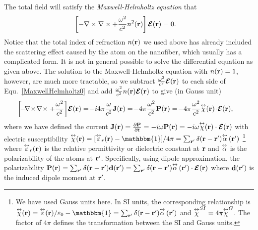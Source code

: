 The total field will satisfy the \textit{Maxwell-Helmholtz equation} that
\begin{align}
\left[ -\nabla\times\nabla\times+\frac{\omega^2}{c^2}n^2(\br) \right] \boldsymbol{\mathcal{E}}(\br) &=0. \label{MaxwellHelmholtz0}
\end{align}
Notice that the total index of refraction $ n(\mathbf{r}) $ we used above has already included the scattering effect caused by the atom on the nanofiber, which usually has a complicated form. It is not in general possible to solve the differential equation as given above. The solution to the Maxwell-Helmholtz equation with $ n(\mathbf{r})=1 $, however, are much more tractable, so we subtract $ \frac{\omega^2}{c^2} \boldsymbol{\mathcal{E}}(\mathbf{r})$ to each side of Equ.~\ref{MaxwellHelmholtz0} and add $ \frac{\omega^2}{c^2}n(\mathbf{r}) \boldsymbol{\mathcal{E}}(\mathbf{r}) $ to give (in Gauss unit)
\begin{align}\label{eq:Maxwellwithsource}
\left[\! -\! \nabla\!\times\!\nabla\!\times + \frac{\omega^2}{c^2} \right]\! \boldsymbol{\mathcal{E}}(\br) &=\! -i4\pi\frac{\omega}{c^2} \mathbf{J}(\br) =\! -4\pi\frac{\omega^2}{c^2} \mathbf{P}(\br)=\! -4\pi \frac{\omega^2}{c^2} \tensor{\chi}(\br)\! \cdot\! \boldsymbol{\mathcal{E}}(\br),
\end{align}
where we have defined the current $ \mathbf{J}(\mathbf{r})=\frac{\partial {\mathbf{P}}}{\partial {t}}=-i\omega\mathbf{P}(\mathbf{r})=-i\omega \overset{\leftrightarrow}{\chi}(\mathbf{r})\cdot \boldsymbol{\mathcal{E}}(\mathbf{r}) $ with electric susceptibility $ \tensor{\chi}(\br)=[\tensor{\varepsilon}_r(\br)-\mathbbm{1}]/4\pi = \sum_{\br'}\delta(\br-\mathbf{r}')\tensor{\alpha} \, (\br')$ \footnote{We have used Gauss units here. In SI units, the corresponding relationship is $ \tensor{\chi}(\br)=\tensor{\varepsilon}(\br)/\varepsilon_0-\mathbbm{1} = \sum_{\br'}\delta(\br-\mathbf{r}')\tensor{\alpha} \, (\br')$ and $\overset{\leftrightarrow}{\chi}^{SI}=4\pi\overset{\leftrightarrow}{\chi}^{G}  $. The factor of $ 4\pi $ defines the transformation between the SI and Gauss units. } where $\overset{\leftrightarrow}{ \varepsilon}_r(\mathbf{r}) $ is the relative permittivity or dielectric constant at $ \mathbf{r} $ and $ \overset{\leftrightarrow}{\alpha} $ is the polarizability of the atoms at $ \mathbf{r}' $. Specifically, using dipole approximation, the polarizability $ \mathbf{P}(\mathbf{r})=\sum_{\mathbf{r}'}\delta(\mathbf{r}-\mathbf{r}')\mathbf{d}(\mathbf{r}')=\sum_{\mathbf{r}'}\delta(\mathbf{r}-\mathbf{r}')\overset{\leftrightarrow}{\alpha} \, (\mathbf{r}')\cdot \boldsymbol{\mathcal{E}}(\mathbf{r}) $ where $ \mathbf{d}(\mathbf{r}') $ is the induced dipole moment at $ \mathbf{r}' $.

